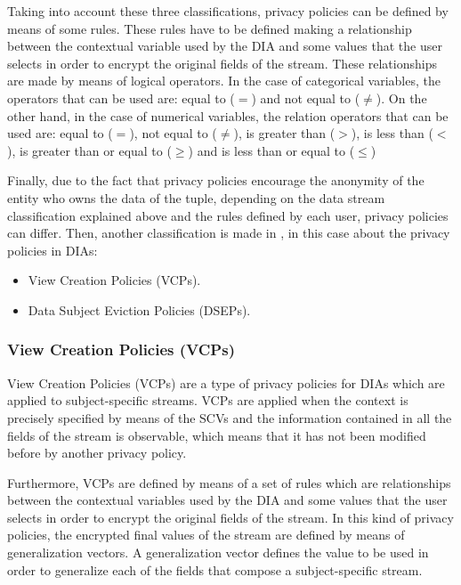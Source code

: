 Taking into account these three classifications, privacy policies can be defined by means of some rules. These rules have to be defined making a relationship between the contextual variable used by the DIA and some values that the user selects in order to encrypt the original fields of the stream. These relationships are made by means of logical operators. In the case of categorical variables, the operators that can be used are: equal to ($=$) and not equal to ($\neq$). On the other hand, in the case of numerical variables, the relation operators that can be used are: equal to ($=$), not equal to ($\neq$), is greater than ($>$), is less than ($<$), is greater than or equal to ($\geq$) and is less than or equal to ($\leq$)

Finally, due to the fact that privacy policies encourage the anonymity of the entity who owns the data of the tuple, depending on the data stream classification explained above and the rules defined by each user, privacy policies can differ. Then, another classification is made in \cite{privacypoliciesarticle}, in this case about the privacy policies in DIAs:

\begin{itemize}

\item View Creation Policies (VCPs).
\item Data Subject Eviction Policies (DSEPs).

\end{itemize}

\subsubsection{View Creation Policies (VCPs)}

View Creation Policies (VCPs) are a type of privacy policies for DIAs which are applied to subject-specific streams. VCPs are applied when the context is precisely specified by means of the SCVs and the information contained in all the fields of the stream is observable, which means that it has not been modified before by another privacy policy.

Furthermore, VCPs are defined by means of a set of rules which are relationships between the contextual variables used by the DIA and some values that the user selects in order to encrypt the original fields of the stream. In this kind of privacy policies, the encrypted final values of the stream are defined by means of generalization vectors. A generalization vector defines the value to be used in order to generalize each of the fields that compose a subject-specific stream.

